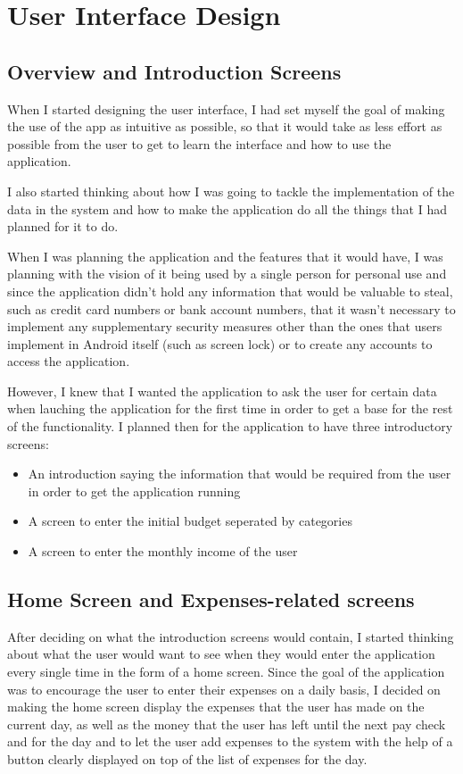 \chapter{User Interface Design}
\section{Overview and Introduction Screens}
When I started designing the user interface, I had set myself the goal of making the use of the app as intuitive as possible, so that it would take as less effort as possible from the user to get to learn the interface and how to use the application.

I also started thinking about how I was going to tackle the implementation of the data in the system and how to make the application do all the things that I had planned for it to do.

When I was planning the application and the features that it would have, I was planning with the vision of it being used by a single person for personal use and since the application didn't hold any information that would be valuable to steal, such as credit card numbers or bank account numbers, that it wasn't necessary to implement any supplementary security measures other than the ones that users implement in Android itself (such as screen lock) or to create any accounts to access the application.

However, I knew that I wanted the application to ask the user for certain data when lauching the application for the first time in order to get a base for the rest of the functionality. I planned then for the application to have three introductory screens:

\begin{itemize}
  \item An introduction saying the information that would be required from the user in order to get the application running
  \item A screen to enter the initial budget seperated by categories
  \item A screen to enter the monthly income of the user
\end{itemize}

\section{Home Screen and Expenses-related screens}
After deciding on what the introduction screens would contain, I started thinking about what the user would want to see when they would enter the application every single time in the form of a home screen. Since the goal of the application was to encourage the user to enter their expenses on a daily basis, I decided on making the home screen display the expenses that the user has made on the current day, as well as the money that the user has left until the next pay check and for the day and to let the user add expenses to the system with the help of a button clearly displayed on top of the list of expenses for the day.

